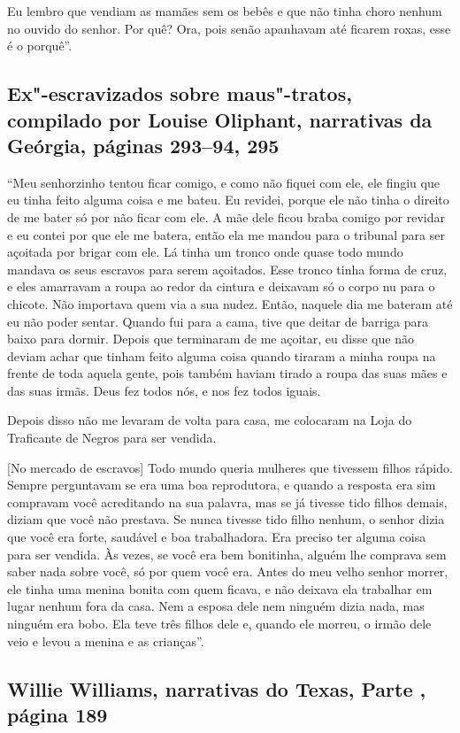 Eu lembro que vendiam as mamães sem os bebês e que não tinha choro
nenhum no ouvido do senhor. Por quê? Ora, pois senão apanhavam até
ficarem roxas, esse é o porquê''.

\subsection{Ex"-escravizados sobre maus"-tratos, compilado por Louise Oliphant, narrativas
da Geórgia, páginas 293--94, 295}

``Meu senhorzinho tentou ficar comigo, e como não fiquei com ele, ele
fingiu que eu tinha feito alguma coisa e me bateu. Eu revidei, porque
ele não tinha o direito de me bater só por não ficar com ele. A mãe dele
ficou braba comigo por revidar e eu contei por que ele me batera, então
ela me mandou para o tribunal para ser açoitada por brigar com ele. Lá
tinha um tronco onde quase todo mundo mandava os seus escravos para
serem açoitados. Esse tronco tinha forma de cruz, e eles amarravam a
roupa ao redor da cintura e deixavam só o corpo nu para o chicote. Não
importava quem via a sua nudez. Então, naquele dia me bateram até eu não
poder sentar. Quando fui para a cama, tive que deitar de barriga para
baixo para dormir. Depois que terminaram de me açoitar, eu disse que não
deviam achar que tinham feito alguma coisa quando tiraram a minha roupa
na frente de toda aquela gente, pois também haviam tirado a roupa das
suas mães e das suas irmãs. Deus fez todos nós, e nos fez todos iguais.

Depois disso não me levaram de volta para casa, me colocaram na Loja do
Traficante de Negros para ser vendida.

{[}No mercado de escravos{]} Todo mundo queria mulheres que
tivessem filhos rápido. Sempre perguntavam se era uma boa reprodutora, e
quando a resposta era sim compravam você acreditando na sua palavra, mas
se já tivesse tido filhos demais, diziam que você não prestava. Se nunca
tivesse tido filho nenhum, o senhor dizia que você era forte, saudável e
boa trabalhadora. Era preciso ter alguma coisa para ser vendida. Às
vezes, se você era bem bonitinha, alguém lhe comprava sem saber nada
sobre você, só por quem você era. Antes do meu velho senhor morrer, ele
tinha uma menina bonita com quem ficava, e não deixava ela trabalhar em
lugar nenhum fora da casa. Nem a esposa dele nem ninguém dizia nada, mas
ninguém era bobo. Ela teve três filhos dele e, quando ele morreu, o
irmão dele veio e levou a menina e as crianças''.

\subsection{Willie Williams, narrativas do Texas, Parte , página 189}
\label{ref293}

